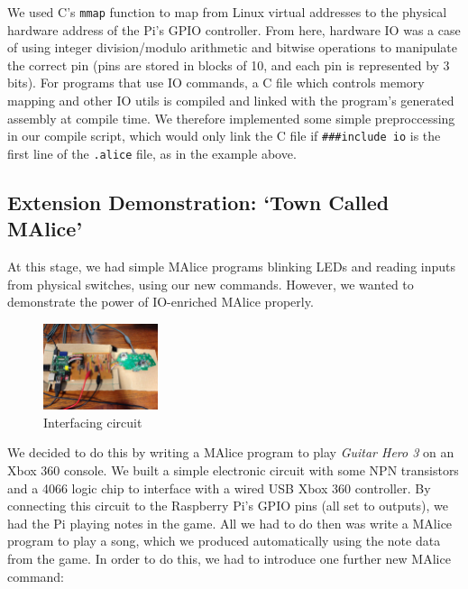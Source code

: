 \documentclass[11pt, notitlepage]{report}
\begin{document}
We used C's \texttt{mmap} function to map from Linux virtual addresses to the physical hardware address of the Pi's GPIO controller. From here, hardware IO was a case of using integer division/modulo arithmetic and bitwise operations to manipulate the correct pin (pins are stored in blocks of 10, and each pin is represented by 3 bits). For programs that use IO commands, a C file which controls memory mapping and other IO utils is compiled and linked with the program's generated assembly at compile time. We therefore implemented some simple preproccessing in our compile script, which would only link the C file if \texttt{\#\#\#include io} is the first line of the \texttt{.alice} file, as in the example above.

\subsection*{Extension Demonstration: `Town Called MAlice'}

At this stage, we had simple MAlice programs blinking LEDs and reading inputs from physical switches, using our new commands. However, we wanted to demonstrate the power of IO-enriched MAlice properly.

 \vspace{-10pt}
\begin{figure}
  \begin{center}
    \includegraphics[width=0.3\textwidth]{IMG_9457.JPG}
    \caption{Interfacing circuit}
  \end{center}
\end{figure}

We decided to do this by writing a MAlice program to play \emph{Guitar Hero 3} on an Xbox 360 console. We built a simple electronic circuit with some NPN transistors and a 4066 logic chip to interface with a wired USB Xbox 360 controller. By connecting this circuit to the Raspberry Pi's GPIO pins (all set to outputs), we had the Pi playing notes in the game. All we had to do then was write a MAlice program to play a song, which we produced automatically using the note data from the game. In order to do this, we had to introduce one further new MAlice command:
\end{document}
